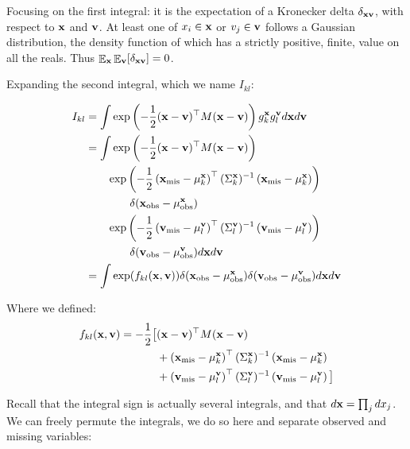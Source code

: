 \documentclass[letterpaper]{article}
\DeclareMathOperator*{\E}{\Ex}
\newcommand{\Ex}{\mathbb{E}}
\newcommand{\tp}{\top}
\newcommand{\vx}{{\bf x}}
\newcommand{\vv}{{\bf v}}
\begin{document}
Focusing on the first integral: it is the expectation of a Kronecker delta
$\delta_{\vx\vv}$, with respect to $\vx$ and $\vv$. At least one of $x_i \in \vx$ or
$v_j \in \vv$ follows a Gaussian distribution, the density function of which has
a strictly positive, finite, value on all
the reals. Thus $\E_\vx\E_\vv[\delta_{\vx\vv}] = 0$.

Expanding the second integral, which we name $I_{kl}$:

\begin{equation*}
\begin{aligned}
I_{kl} &= \int \exp\left(-\frac{1}{2}(\vx-\vv)^\tp M (\vx-\vv)\right) g_k^\vx g_l^\vv d\vx
d\vv \\
&= \int \exp\left(-\frac{1}{2}(\vx-\vv)^\tp M (\vx-\vv)\right) \\
&\hspace{2em}\exp\left(-\frac{1}{2}\left(\vx_\text{mis} -
    \mu_k^\vx\right)^\tp(\Sigma_k^\vx)^{-1}\left(\vx_\text{mis} - \mu_k^\vx\right)\right) \\
& \hspace{4em} \delta(\vx_\text{obs}-\mu^\vx_\text{obs}) \\
&\hspace{2em}\exp\left(-\frac{1}{2}\left(\vv_\text{mis} -
    \mu_l^\vv\right)^\tp(\Sigma_l^\vv)^{-1}\left(\vv_\text{mis} - \mu_l^\vv\right)\right)\\
&\hspace{4em} \delta(\vv_\text{obs}-\mu^\vv_\text{obs})
d\vx d\vv \\
&= \int \exp( f_{kl}(\vx, \vv) ) \delta(\vx_\text{obs}-\mu^\vx_\text{obs}) \delta(\vv_\text{obs}-\mu^\vv_\text{obs}) d\vx d\vv
\end{aligned}
\end{equation*}

Where we defined:
\begin{equation*}
\begin{aligned}
  f_{kl}(\vx, \vv) = -\frac{1}{2}\big[ &(\vx-\vv)^\tp M (\vx-\vv) \\
&+ \left(\vx_\text{mis} - \mu_k^\vx\right)^\tp(\Sigma_k^\vx)^{-1}\left(\vx_\text{mis} - \mu_k^\vx\right) \\
&+ \left(\vv_\text{mis} - \mu_l^\vv\right)^\tp(\Sigma_l^\vv)^{-1}\left(\vv_\text{mis} - \mu_l^\vv\right) \big]
\end{aligned}
\end{equation*}

Recall that the integral sign is actually several integrals, and that $d\vx =
\prod_j dx_j$. We can freely permute the integrals, we do so here and separate
observed and missing variables:
\end{document}
